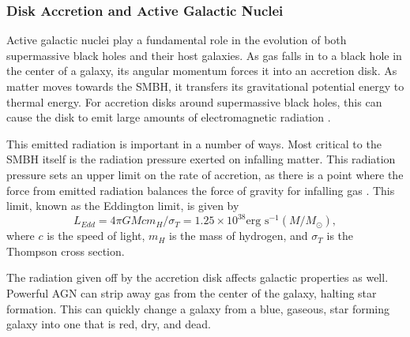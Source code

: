 \subsubsection{Disk Accretion and Active Galactic Nuclei}

Active galactic nuclei play a fundamental role in the evolution of both supermassive black holes and their host galaxies.  As gas falls in to a black hole in the center of a galaxy, its angular momentum forces it into an accretion disk.  As matter moves towards the SMBH, it transfers its gravitational potential energy to thermal energy.  For accretion disks around supermassive black holes, this can cause the disk to emit large amounts of electromagnetic radiation \citep{lin_1996}.

This emitted radiation is important in a number of ways.  Most critical to the SMBH itself is the radiation pressure exerted on infalling matter.  This radiation pressure sets an upper limit on the rate of accretion, as there is a point where the force from emitted radiation balances the force of gravity for infalling gas \citep{rybicki_lightman_1979}.  This limit, known as the Eddington limit, is given by
\begin{equation} \label{eq:L_Edd}
  L_{Edd} = 4 \pi G M c m_{H} / \sigma_{T} = 1.25 \times 10^{38} \textrm{erg s}^{-1} (M / M_{\odot}),
\end{equation}
where $c$ is the speed of light, $m_{H}$ is the mass of hydrogen, and $\sigma_{T}$ is the Thompson cross section.

The radiation given off by the accretion disk affects galactic properties as well.  Powerful AGN can strip away gas from the center of the galaxy, halting star formation.  This can quickly change a galaxy from a blue, gaseous, star forming galaxy into one that is red, dry, and dead.



